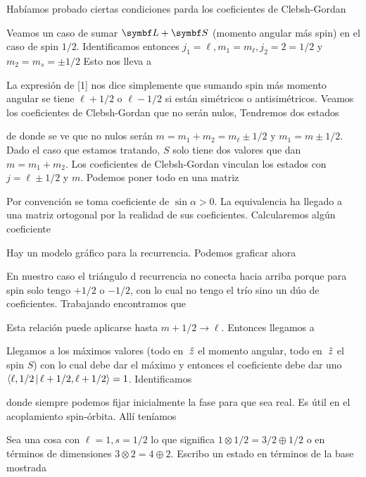 \documentclass[10pt,oneside]{CBFT_book}
\begin{document}
Habíamos probado ciertas condiciones parda los coeficientes de Clebsh-Gordan


Veamos un caso de sumar $\vb L + \vb S$ (momento angular más spin) en el caso de spin $1/2$.
Identificamos entonces $j_1 = \ell, m_1 = m_\ell, j_2 = 2 = 1/2$ y $m_2 = m_s = \pm 1/2$ 
Esto nos lleva a


La expresión de [1] nos dice simplemente que sumando spin más momento angular se tiene $\ell+1/2$ 
o $\ell - 1/2$ si están simétricos o antisimétricos. Veamos los coeficientes de Clebsh-Gordan que
no serán nulos,
Tendremos dos estados





de donde se ve que no nulos serán $ m = m_1 + m_2 = m_\ell \pm 1/2 $ y  $m_1 = m \pm 1/2$.
Dado el caso que estamos tratando, $S$ solo tiene dos valores que dan $ m = m_1 + m_2 $. Los
coeficientes de Clebsh-Gordan vinculan los estados con $j = \ell \pm 1/2$ y $m$. Podemos poner
todo en una matriz



Por convención se toma coeficiente de $\sin\alpha > 0$. La equivalencia ha llegado a una matriz
ortogonal por la realidad de sus coeficientes. Calcularemos algún coeficiente


Hay un modelo gráfico para la recurrencia. Podemos graficar ahora


En nuestro caso el triángulo d recurrencia no conecta hacia arriba porque para spin solo tengo
$+ 1/2$ o $-1/2$, con lo cual no tengo el trío sino un dúo de coeficientes.
Trabajando encontramos que


Esta relación puede aplicarse hasta $m+1/2 \to \ell$. Entonces llegamos a



Llegamos a los máximos valores (todo en $\:\hat{z}$ el momento angular, todo en $\:\hat{z}$ el spin $S$)
con lo cual debe dar el máximo y entonces el coeficiente debe dar uno $\Braket{\ell,1/2| \ell+1/2,\ell+1/2} = 1$.
Identificamos


donde siempre podemos fijar inicialmente la fase para que sea real.
Es útil en el acoplamiento spin-órbita. Allí teníamos



Sea una cosa con $\ell=1, s=1/2$ lo que significa  $ 1 \otimes 1/2 = 3/2 \oplus 1/2$ o en términos
de dimensiones $ 3 \otimes 2 = 4 \oplus 2 $.
Escribo un estado en términos de la base mostrada


\end{document}
